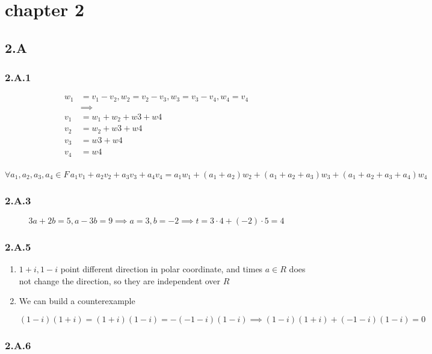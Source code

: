 \section{chapter 2}
\subsection*{2.A}
\subsubsection*{2.A.1}

\begin{equation*}
    \begin{split}
w_{1} &= v_{1} - v_{2}, w_{2} = v_{2} - v_{3}, w_{3} = v_{3} - v_{4}, w_{4} = v_{4} \\
&\implies \\
v_{1} &= w_{1} + w_{2} + w{3} + w{4} \\
v_{2} &= w_{2} + w{3} + w{4} \\
v_{3} &= w{3} + w{4} \\
v_{4} &= w{4} \\
    \end{split}
\end{equation*}

\[
\forall a_{1}, a_{2}, a_{3}, a_{4} \in F \,
a_{1}v_{1} + a_{2}v_{2} + a_{3}v_{3} + a_{4}v_{4} = 
a_{1}w_{1} + (a_{1} + a_{2})w_{2}  + (a_{1} + a_{2} +a_{3})w_{3} + (a_{1} + a_{2} +a_{3}+a_{4})w_{4}
\]

\subsubsection*{2.A.3}
\[3a+2b = 5, a - 3b = 9 \implies a=3, b=-2 \implies t = 3\cdot 4 + (-2)\cdot 5 = 4 \]

\subsubsection*{2.A.5}
\begin{enumerate}[label=(\alph*)]
\item $1+i, 1-i$ point different direction in polar coordinate, and times $a\in R$ does not change the direction, so they are independent over $R$
\item We can build a counterexample

\[(1-i)(1+i) = (1+i)(1-i) = -(-1-i)(1-i) \implies (1-i)(1+i) + (-1-i)(1-i) = 0\]
\end{enumerate}

\subsubsection*{2.A.6}

